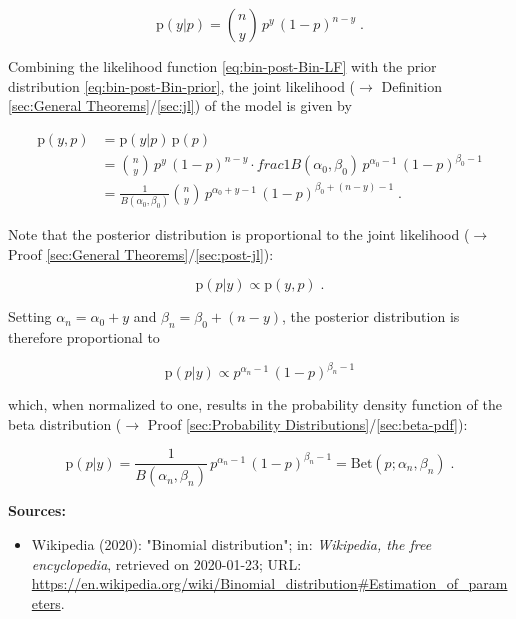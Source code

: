 \documentclass[a4paper,12pt,twoside]{book}
\begin{document}
\begin{equation} \label{eq:bin-post-Bin-LF}
\mathrm{p}(y|p) = {n \choose y} \, p^y \, (1-p)^{n-y} \; .
\end{equation}

Combining the likelihood function \eqref{eq:bin-post-Bin-LF} with the prior distribution \eqref{eq:bin-post-Bin-prior}, the joint likelihood ($\rightarrow$ Definition \ref{sec:General Theorems}/\ref{sec:jl}) of the model is given by

\begin{equation} \label{eq:bin-post-Bin-JL}
\begin{split}
\mathrm{p}(y,p) &= \mathrm{p}(y|p) \, \mathrm{p}(p) \\
&= {n \choose y} \, p^y \, (1-p)^{n-y} \cdot frac{1}{B(\alpha_0,\beta_0)} \, p^{\alpha_0-1} \, (1-p)^{\beta_0-1} \\
&= \frac{1}{B(\alpha_0,\beta_0)} {n \choose y} \, p^{\alpha_0+y-1} \, (1-p)^{\beta_0+(n-y)-1} \; .
\end{split}
\end{equation}

Note that the posterior distribution is proportional to the joint likelihood ($\rightarrow$ Proof \ref{sec:General Theorems}/\ref{sec:post-jl}):

\begin{equation} \label{eq:bin-post-Bin-post-s1}
\mathrm{p}(p|y) \propto \mathrm{p}(y,p) \; .
\end{equation}

Setting $\alpha_n = \alpha_0 + y$ and $\beta_n = \beta_0 + (n-y)$, the posterior distribution is therefore proportional to

\begin{equation} \label{eq:bin-post-Bin-post-s2}
\mathrm{p}(p|y) \propto p^{\alpha_n-1} \, (1-p)^{\beta_n-1}
\end{equation}

which, when normalized to one, results in the probability density function of the beta distribution ($\rightarrow$ Proof \ref{sec:Probability Distributions}/\ref{sec:beta-pdf}):

\begin{equation} \label{eq:bin-post-Bin-post-qed}
\mathrm{p}(p|y) = \frac{1}{B(\alpha_n,\beta_n)} \, p^{\alpha_n-1} \, (1-p)^{\beta_n-1} = \mathrm{Bet}(p; \alpha_n, \beta_n) \; .
\end{equation}


\vspace{1em}
\textbf{Sources:}
\begin{itemize}
\item Wikipedia (2020): "Binomial distribution"; in: \textit{Wikipedia, the free encyclopedia}, retrieved on 2020-01-23; URL: \url{https://en.wikipedia.org/wiki/Binomial_distribution#Estimation_of_parameters}.
\end{itemize}
\end{document}
